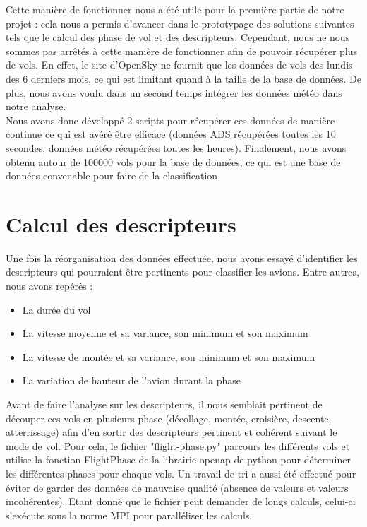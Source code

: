 Cette manière de fonctionner nous a été utile pour la première partie de notre projet : cela nous a permis d'avancer dans le prototypage des solutions suivantes tels que le calcul des phase de vol et des descripteurs. Cependant, nous ne nous sommes pas arrêtés à cette manière de fonctionner afin de pouvoir récupérer plus de vols. En effet, le site d'OpenSky ne fournit que les données de vols des lundis des 6 derniers mois, ce qui est limitant quand à la taille de la base de données. De plus, nous avons voulu dans un second temps intégrer les données météo dans notre analyse.\\

Nous avons donc développé 2 scripts pour récupérer ces données de manière continue ce qui est avéré être efficace (données ADS récupérées toutes les 10 secondes, données météo récupérées toutes les heures). Finalement, nous avons obtenu autour de 100000 vols pour la base de données, ce qui est une base de données convenable pour faire de la classification. \\

\section*{Calcul des descripteurs}


Une fois la réorganisation des données effectuée, nous avons essayé d'identifier les descripteurs qui pourraient être pertinents pour classifier les avions. Entre autres, nous avons repérés : 

\begin{itemize}
	\item La durée du vol
	\item La vitesse moyenne et sa variance, son minimum et son maximum
	\item La vitesse de montée et sa variance, son minimum et son maximum
	\item La variation de hauteur de l'avion durant la phase
\end{itemize}

Avant de faire l'analyse sur les descripteurs, il nous semblait pertinent de découper ces vols en plusieurs phase (décollage, montée, croisière, descente, atterrissage) afin d'en sortir des descripteurs pertinent et cohérent suivant le mode de vol. Pour cela, le fichier "flight-phase.py" parcours les différents vols et utilise la fonction FlightPhase de la librairie openap de python pour déterminer les différentes phases pour chaque vols. Un travail de tri a aussi été effectué pour éviter de garder des données de mauvaise qualité (absence de valeurs et valeurs incohérentes). Etant donné que le fichier peut demander de longs calculs, celui-ci s'exécute sous la norme MPI pour paralléliser les calculs. \\


